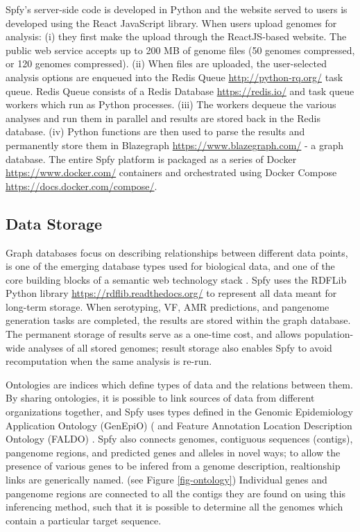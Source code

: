\documentclass[a4,center,fleqn]{NAR}
\begin{document}
Spfy's server-side code is developed in Python and the website served to users is developed using the React JavaScript library.
When users upload genomes for analysis: (i) they first make the upload through the ReactJS-based website. 
The public web service accepts up to 200 MB of genome files (50 genomes compressed, or 120 genomes compressed).
(ii) When files are uploaded, the user-selected analysis options are enqueued into the Redis Queue \url{http://python-rq.org/} task queue.
Redis Queue consists of a Redis Database \url{https://redis.io/} and task queue workers which run as Python processes.
(iii) The workers dequeue the various analyses and run them in parallel and results are stored back in the Redis database.
(iv) Python functions are then used to parse the results and permanently store them in Blazegraph \url{https://www.blazegraph.com/} - a graph database.
The entire Spfy platform is packaged as a series of Docker \url{https://www.docker.com/} containers and orchestrated using Docker Compose \url{https://docs.docker.com/compose/}.

\subsection{Data Storage}
Graph databases focus on describing relationships between different data points, is one of the emerging \cite{de2015trends} database types used for biological data, and one of the core building blocks of a semantic web technology stack \cite{horrocks2005semantic}.
Spfy uses the RDFLib Python library \url{https://rdflib.readthedocs.org/} to represent all data meant for long-term storage.
When serotyping, VF, AMR predictions, and pangenome generation tasks are completed, the results are stored within the graph database.
The permanent storage of results serve as a one-time cost, and allows population-wide analyses of all stored genomes; result storage also enables Spfy to avoid recomputation when the same analysis is re-run.

Ontologies are indices which define types of data and the relations between them.
By sharing ontologies, it is possible to link sources of data from different organizations together, and Spfy uses types defined in the  Genomic Epidemiology Application Ontology (GenEpiO) (\cite{griffiths2017context} and Feature Annotation Location Description Ontology (FALDO) \cite{bolleman2016faldo}.
Spfy also connects genomes, contiguous sequences (contigs), pangenome regions, and predicted genes and alleles in novel ways; to allow the presence of various genes to be infered from a genome description, realtionship links are generically named.
(see Figure \ref{fig-ontology})
Individual genes and pangenome regions are connected to all the contigs they are found on using this inferencing method, such that it is possible to determine all the genomes which contain a particular target sequence.
\end{document}

